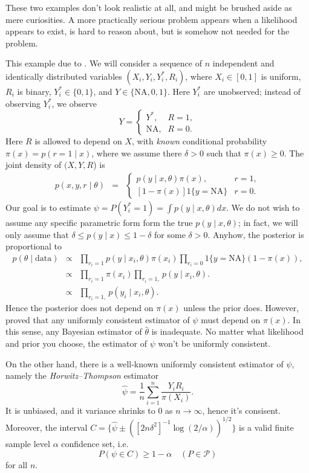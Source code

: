 These two examples don't look realistic at all, and might be brushed
aside as mere curiosities. A more practically serious problem appears
when a likelihood appears to exist, is hard to reason about, but is
somehow not needed for the problem.
\begin{example}
 This example due to \textcite{Robins2012-fr}. We will consider a sequence
of $n$ independent and identically distributed variables $(X_{i},Y_{i},Y_{i}^{*},R_{i})$,
where $X_{i}\in[0,1]$ is uniform,  $R_{i}$ is binary, $Y_{i}^{*}\in\{0,1\}$,
and $Y\in\{\textrm{NA},0,1\}$. Here $Y_i^{*}$ are unobserved; instead
of observing $Y_{i}^{*}$, we observe
\[
Y=\begin{cases}
Y^{*}, & R=1,\\
\textrm{NA}, & R=0.
\end{cases}
\]
Here $R$ is allowed to depend on $X$, with \emph{known} conditional
probability $\pi(x)=p(r=1\mid x)$, where we assume there $\delta>0$
such that $\pi(x)\geq0$. The joint density of $(X,Y,R$) is
\begin{eqnarray*}
p(x,y,r\mid\theta) & = & \begin{cases}
p(y\mid x,\theta)\pi(x), & r=1,\\{}
[1-\pi(x)]1\{y=\textrm{NA}\} & r=0.
\end{cases}
\end{eqnarray*}
Our goal is to estimate $\psi=P(Y_{i}^{*}=1)=\int p(y\mid x,\theta)dx$.
We do not wish to assume any specific parametric form form the true
$p(y\mid x,\theta)$; in fact, we will only assume that $\delta\leq p(y\mid x)\leq1-\delta$
for some $\delta>0$. Anyhow, the posterior is proportional to
\begin{eqnarray*}
p(\theta\mid\textrm{data}) & \propto & \prod_{r_{i}=1}p(y\mid x_{i},\theta)\pi(x_{i})\prod_{r_{i}=0}1\{y=\textrm{NA}\}(1-\pi(x)),\\
 & \propto & \prod_{r_{i}=1}\pi(x_{i})\prod_{r_{i}=1,}p(y\mid x_{i},\theta).\\
 & \propto & \prod_{r_{i}=1,}p(y_{i}\mid x_{i},\theta).
\end{eqnarray*}
Hence the posterior does not depend on $\pi(x)$ unless the prior
does. However, \textcite{Robins1997-uv} proved that any uniformly consistent
estimator of $\psi$ must depend on $\pi(x)$. In this sense, any Bayesian estimator of $\hat{\theta}$ is inadequate. No matter what likelihood and prior you choose, the estimator of $\psi$ won't be uniformly consistent.

On the other hand, there is a well-known uniformly consistent estimator of $\psi$,
namely the \emph{Horwitz--Thompson} estimator
\begin{equation}
\hat{\psi}=\frac{1}{n}\sum_{i=1}^{n}\frac{Y_{i}R_{i}}{\pi(X_{i})}.\label{eq:Horwitz-Thompson}
\end{equation}
It is unbiased, and it variance shrinks to $0$ as $n\to\infty$,
hence it's consisent. Moreover, the interval $C=\{\hat{\psi}\pm([2n\delta^{2}]^{-1}\log(2/\alpha))^{1/2}\}$
is a valid finite sample level $\alpha$ confidence set, i.e.
\[
P(\psi\in C)\geq1-\alpha\quad(P\in\mathcal{P})
\]
for all $n$.
\end{example}

